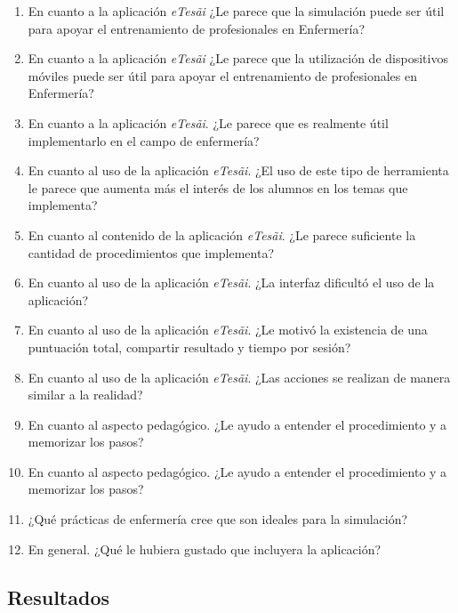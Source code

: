 \begin{enumerate}
    \item En cuanto a la aplicación \textit{eTes\~{a}i} ¿Le parece que la simulación puede
    ser útil para apoyar el entrenamiento de profesionales en Enfermería?
\item En cuanto a la aplicación \textit{eTes\~{a}i} ¿Le parece que la utilización de
    dispositivos móviles puede ser útil para apoyar el entrenamiento de
    profesionales en Enfermería?
\item En cuanto a la aplicación \textit{eTes\~{a}i}. ¿Le parece que es realmente útil
    implementarlo en el campo de enfermería?
\item En cuanto al uso de la aplicación \textit{eTes\~{a}i}. ¿El uso de este tipo de
    herramienta le parece que aumenta más el interés de los alumnos en los temas
    que implementa?
\item En cuanto al contenido de la aplicación \textit{eTes\~{a}i}. ¿Le parece
    suficiente la cantidad de procedimientos que implementa?
\item En cuanto al uso de la aplicación \textit{eTes\~{a}i}. ¿La interfaz dificultó el
    uso de la aplicación?
\item En cuanto al uso de la aplicación \textit{eTes\~{a}i}. ¿Le motivó la existencia
    de una puntuación total, compartir resultado y tiempo por sesión?
\item En cuanto al uso de la aplicación \textit{eTes\~{a}i}. ¿Las acciones se realizan
    de manera similar a la realidad?
\item En cuanto al aspecto pedagógico. ¿Le ayudo a entender el procedimiento y a
    memorizar los pasos?
\item En cuanto al aspecto pedagógico. ¿Le ayudo a entender el procedimiento y a
    memorizar los pasos?
\item ¿Qué prácticas de enfermería cree que son ideales para la simulación?
\item En general. ¿Qué le hubiera gustado que incluyera la aplicación?
\end{enumerate}

\subsection{Resultados}

